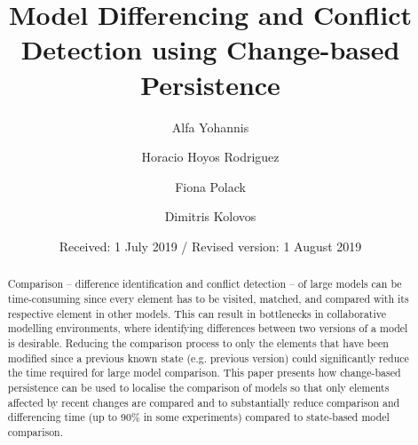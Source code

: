 %
%

    
\renewcommand{\thelstlisting}{\arabic{lstlisting}}
\renewcommand{\labelitemi}{$\bullet$}
\newcommand{\AndA}{\textnormal{\textbf{and }}}
\newcommand{\Is}{\textnormal{\textbf{is }}}
\newcommand{\Not}{\textnormal{\textbf{not }}}
\newcommand{\In}{\textnormal{\textbf{in }}}
\newcommand{\Or}{\textnormal{\textbf{or }}}
\newcommand{\eqnum}{\refstepcounter{equation}\textup{\tagform@{\theequation}}}

%
\title{Model Differencing and Conflict Detection using Change-based Persistence}
\author{Alfa Yohannis \and Horacio Hoyos Rodriguez \and Fiona Polack \and Dimitris Kolovos%
}                     %
%
\offprints{}          %
%
%
\date{Received: 1 July 2019 / Revised version: 1 August 2019}
%
\maketitle
%
\begin{abstract}
Comparison -- difference identification and conflict detection -- of large models can be time-consuming since every element has to be visited, matched, and compared with its respective element in other models. This can result in bottlenecks in collaborative modelling environments, where identifying differences between two versions of a model is desirable. Reducing the comparison process to only the elements that have been modified since a previous known state (e.g. previous version) could significantly reduce the time required for large model comparison. This paper presents how change-based persistence can be used to localise the comparison of models so that only elements affected by recent changes are compared and to substantially reduce comparison and differencing time (up to 90\% in some experiments) compared to state-based model comparison. 
\end{abstract}
%

